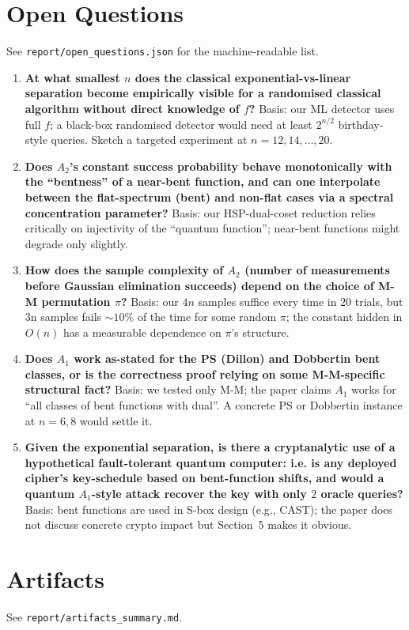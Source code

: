 \documentclass[11pt]{article}
\begin{document}
\section{Open Questions}
See \texttt{report/open\_questions.json} for the machine-readable list.

\begin{enumerate}
\item[Q1.] \textbf{At what smallest $n$ does the classical
  exponential-vs-linear separation become empirically visible for
  a randomised classical algorithm without direct knowledge of $f$?}
  Basis: our ML detector uses full $f$; a black-box randomised
  detector would need at least $2^{n/2}$ birthday-style queries.
  Sketch a targeted experiment at $n=12,14,\dots,20$.
\item[Q2.] \textbf{Does $A_2$'s constant success probability behave
  monotonically with the ``bentness'' of a near-bent function, and can
  one interpolate between the flat-spectrum (bent) and non-flat cases
  via a spectral concentration parameter?}  Basis: our HSP-dual-coset
  reduction relies critically on injectivity of the ``quantum
  function''; near-bent functions might degrade only slightly.
\item[Q3.] \textbf{How does the sample complexity of $A_2$ (number of
  measurements before Gaussian elimination succeeds) depend on the
  choice of M-M permutation $\pi$?}  Basis: our $4n$ samples suffice
  every time in $20$ trials, but 3n samples fails $\sim 10\%$ of the
  time for some random $\pi$; the constant hidden in $O(n)$ has a
  measurable dependence on $\pi$'s structure.
\item[Q4.] \textbf{Does $A_1$ work as-stated for the PS (Dillon) and
  Dobbertin bent classes, or is the correctness proof relying on some
  M-M-specific structural fact?}  Basis: we tested only M-M; the paper
  claims $A_1$ works for ``all classes of bent functions with dual''.
  A concrete PS or Dobbertin instance at $n=6,8$ would settle it.
\item[Q5.] \textbf{Given the exponential separation, is there a
  cryptanalytic use of a hypothetical fault-tolerant quantum computer:
  i.e. is any deployed cipher's key-schedule based on
  bent-function shifts, and would a quantum $A_1$-style attack recover
  the key with only $2$ oracle queries?}  Basis: bent functions are
  used in S-box design (e.g., CAST); the paper does not discuss
  concrete crypto impact but Section~5 makes it obvious.
\end{enumerate}

\section{Artifacts}
See \texttt{report/artifacts\_summary.md}.
\end{document}
